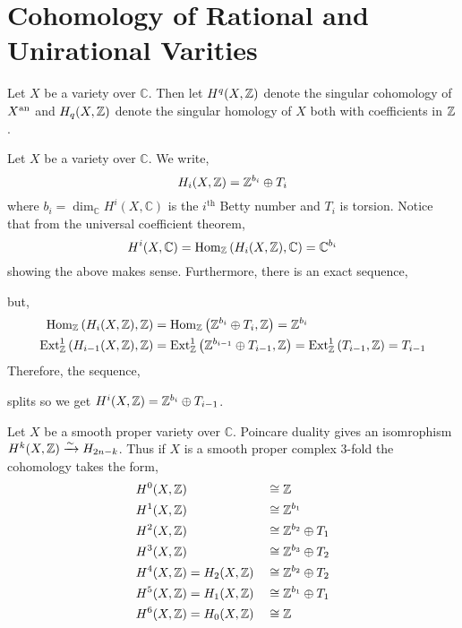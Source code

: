 \documentclass[12pt]{article}
\renewcommand{\C}{\mathbb{C}}
\begin{document}
\section{Cohomology of Rational and Unirational Varities}

\begin{rmk}
Let $X$ be a variety over $\mathbb{C}$. Then let $H^q(X, \mathbb{Z})$ denote the singular cohomology of $X^{\mathrm{an}}$ and $H_q(X, \mathbb{Z})$ denote the singular homology of $X$ both with coefficients in $\mathbb{Z}$.
\end{rmk}

\begin{rmk}
Let $X$ be a variety over $\mathbb{C}$. We write,
\[ H_i(X, \mathbb{Z}) = \mathbb{Z}^{b_i} \oplus T_i \] 
where $b_i = \dim_{\C} H^i(X, \C)$ is the $i^{\mathrm{th}}$ Betty number and $T_i$ is torsion. Notice that from the universal coefficient theorem, 
\[ H^i(X, \C) = \Hom{\Z}{H_i(X, \Z)}{\C} = \C^{b_i} \]
showing the above makes sense. Furthermore, there is an exact sequence,
\begin{center}
\end{center}
but,
\begin{align*}
\mathrm{Hom}_{\mathbb{Z}} \left( H_i(X, \mathbb{Z}), \mathbb{Z} \right) & = \mathrm{Hom}_{\mathbb{Z}} \left( \mathbb{Z}^{b_{i}} \oplus T_{i}, \mathbb{Z} \right) = \mathbb{Z}^{b_{i}}
\\
\mathrm{Ext}^{1}_{\mathbb{Z}} \left( H_{i-1}(X, \mathbb{Z}), \mathbb{Z} \right) & = \mathrm{Ext}^{1}_{\mathbb{Z}} \left( \mathbb{Z}^{b_{i-1}} \oplus T_{i-1}, \mathbb{Z} \right) = \mathrm{Ext}^{1}_{\mathbb{Z}} \left( T_{i-1}, \mathbb{Z} \right) = T_{i-1} 
\end{align*}
Therefore, the sequence,
\begin{center}
\end{center}
splits so we get $H^i(X, \mathbb{Z}) = \mathbb{Z}^{b_i} \oplus T_{i-1}$.
\end{rmk}

\begin{rmk}
Let $X$ be a smooth proper variety over $\C$. Poincare duality gives an isomrophism $H^k(X, \mathbb{Z}) \xrightarrow{\sim} H_{2n - k}$. Thus if $X$ is a smooth proper complex $3$-fold the cohomology takes the form,
\begin{align*}
H^0(X, \mathbb{Z}) & & & \cong \mathbb{Z} 
\\
H^1(X, \mathbb{Z}) & & &  \cong \mathbb{Z}^{b_1}
\\
H^2(X, \mathbb{Z}) & & & \cong \mathbb{Z}^{b_2} \oplus T_1
\\
H^3(X, \mathbb{Z}) & & &\cong \mathbb{Z}^{b_3} \oplus T_2
\\
H^4(X, \mathbb{Z}) & = H_2(X, \mathbb{Z}) & & \cong \mathbb{Z}^{b_2} \oplus T_2
\\
H^5(X, \mathbb{Z}) & = H_1(X, \mathbb{Z}) & & \cong \mathbb{Z}^{b_1} \oplus T_1
\\
H^6(X, \mathbb{Z}) & = H_0(X, \mathbb{Z}) & & \cong \mathbb{Z}
\end{align*}
\end{rmk}
\end{document}
